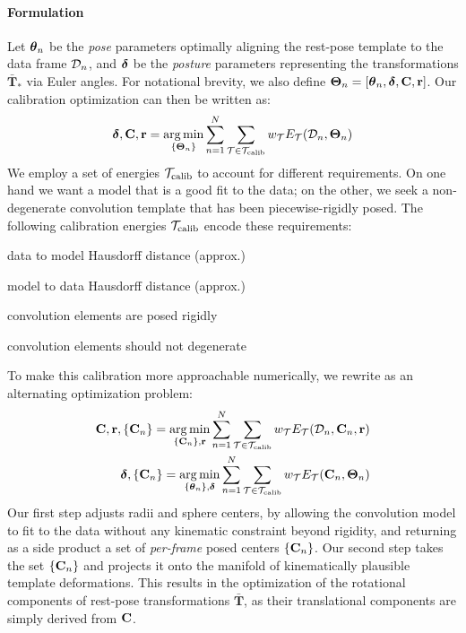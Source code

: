 


\paragraph{Formulation}
Let $\boldsymbol{\theta}_n$ be the \emph{pose} parameters optimally aligning the rest-pose template to the data frame $\mathcal{D}_n$, and $\boldsymbol{\delta}$ be the \emph{posture} parameters representing the transformations $\mathbf{\bar{T}}_*$ via Euler angles. For notational brevity, we also define $\boldsymbol{\Theta}_n=[\boldsymbol{\theta}_n, \boldsymbol{\delta}, {\mathbf{C}}, {\mathbf{r}}]$. Our calibration optimization can then be written as:
% 
\begin{eqnarray}
\boldsymbol{\delta}, {\mathbf{C}}, {\mathbf{r}} = \operatorname*{arg\,min}_{\{\boldsymbol{\Theta}_n\}}
\sum_{n=1}^N 
\sum_{\mathcal{T} \in {\mathcal{T}_\text{calib}}} 
w_\mathcal{T} E_\mathcal{T}(\mathcal{D}_n, \boldsymbol{\Theta}_n)
\label{eq:calibration}
\end{eqnarray}
% 
We employ a set of energies ${\mathcal{T}_\text{calib}}$ to account for different requirements. On one hand we want a model that is a good fit to the data; on the other, we seek a non-degenerate convolution template that has been piecewise-rigidly posed. The following calibration energies ${\mathcal{T}_\text{calib}}$ encode these requirements:
% 
\begin{description}[labelsep=0em,labelwidth=.4in,labelindent=1cm,itemsep=-.6em]
\item[d2m] data to model Hausdorff distance (approx.)
\item[m2d] model to data Hausdorff distance (approx.)
\item[rigid] convolution elements are posed rigidly
\item[valid] convolution elements should not degenerate
\end{description}
% 
To make this calibration more approachable numerically, we rewrite  as an alternating optimization problem:
% 
\begin{eqnarray}
{\mathbf{C}}, {\mathbf{r}}, {\{\mathbf{C}_n\}} =
\operatorname*{arg\,min}_{{\{\mathbf{C}_n\}}, {\mathbf{r}}} 
\sum_{n=1}^N 
\sum_{\mathcal{T} \in {\mathcal{T}_\text{calib}}}
w_\mathcal{T} E_\mathcal{T}(\mathcal{D}_n, {\mathbf{C}}_n, {\mathbf{r}})
\label{eq:step1}
\\
\boldsymbol{\delta}, {\{\mathbf{C}_n\}} =
\operatorname*{arg\,min}_{{\{\boldsymbol{\theta}_n\}},\boldsymbol{\delta}} 
\sum_{n=1}^N 
\sum_{\mathcal{T} \in {\mathcal{T}_\text{calib}}}
w_\mathcal{T} E_\mathcal{T}({\mathbf{C}}_n, \boldsymbol{\Theta}_n) 
\end{eqnarray}
% 
Our first step adjusts radii and sphere centers, by allowing the convolution model to fit to the data without any kinematic constraint beyond rigidity, and returning as a side product a set of \emph{per-frame} posed centers ${\{\mathbf{C}_n\}}$. Our second step takes the set ${\{\mathbf{C}_n\}}$ and projects it onto the manifold of kinematically plausible template deformations. This results in the optimization of the rotational components of rest-pose transformations $\mathbf{\bar{T}}$, as their translational components are simply derived from ${\mathbf{C}}$.

